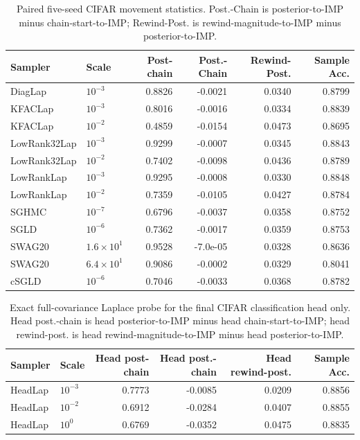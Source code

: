 \begin{table}[t]
\centering
\small
\setlength{\tabcolsep}{4pt}
\begin{tabular}{llrrrr}
\toprule
Sampler & Scale & Post-chain & Post.-Chain & Rewind-Post. & Sample Acc. \\
\midrule
DiagLap & $10^{-3}$ & 0.8826 & -0.0021 & 0.0340 & 0.8799 \\
KFACLap & $10^{-3}$ & 0.8016 & -0.0016 & 0.0334 & 0.8839 \\
KFACLap & $10^{-2}$ & 0.4859 & -0.0154 & 0.0473 & 0.8695 \\
LowRank32Lap & $10^{-3}$ & 0.9299 & -0.0007 & 0.0345 & 0.8843 \\
LowRank32Lap & $10^{-2}$ & 0.7402 & -0.0098 & 0.0436 & 0.8789 \\
LowRankLap & $10^{-3}$ & 0.9295 & -0.0008 & 0.0330 & 0.8848 \\
LowRankLap & $10^{-2}$ & 0.7359 & -0.0105 & 0.0427 & 0.8784 \\
SGHMC & $10^{-7}$ & 0.6796 & -0.0037 & 0.0358 & 0.8752 \\
SGLD & $10^{-6}$ & 0.7362 & -0.0017 & 0.0359 & 0.8753 \\
SWAG20 & $1.6\times 10^{1}$ & 0.9528 & -7.0e-05 & 0.0328 & 0.8636 \\
SWAG20 & $6.4\times 10^{1}$ & 0.9086 & -0.0002 & 0.0329 & 0.8041 \\
cSGLD & $10^{-6}$ & 0.7046 & -0.0033 & 0.0368 & 0.8782 \\
\bottomrule
\end{tabular}
\caption{Paired five-seed CIFAR movement statistics. Post.-Chain is posterior-to-IMP minus chain-start-to-IMP; Rewind-Post. is rewind-magnitude-to-IMP minus posterior-to-IMP.}
\label{tab:cifar-movement-stats}
\end{table}

\begin{table}[t]
\centering
\small
\setlength{\tabcolsep}{4pt}
\begin{tabular}{llrrrr}
\toprule
Sampler & Scale & Head post-chain & Head post.-chain & Head rewind-post. & Sample Acc. \\
\midrule
HeadLap & $10^{-3}$ & 0.7773 & -0.0085 & 0.0209 & 0.8856 \\
HeadLap & $10^{-2}$ & 0.6912 & -0.0284 & 0.0407 & 0.8855 \\
HeadLap & $10^{0}$ & 0.6769 & -0.0352 & 0.0475 & 0.8835 \\
\bottomrule
\end{tabular}
\caption{Exact full-covariance Laplace probe for the final CIFAR
classification head only. Head post.-chain is head posterior-to-IMP
minus head chain-start-to-IMP; head rewind-post. is head
rewind-magnitude-to-IMP minus head posterior-to-IMP.}
\label{tab:cifar-head-laplace-stats}
\end{table}

